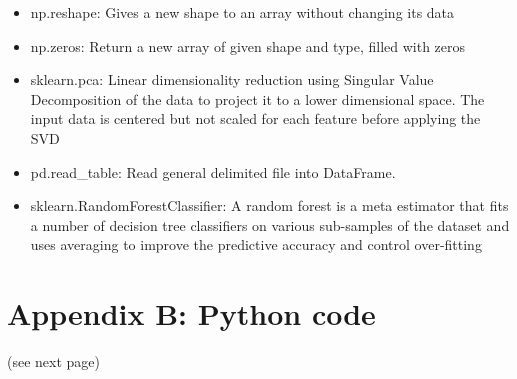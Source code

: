 \documentclass{cup-pan}
\begin{document}
\begin{itemize}
	\item np.reshape: Gives a new shape to an array without changing its data \\
	\item np.zeros: Return a new array of given shape and type, filled with zeros\\
	\item sklearn.pca: Linear dimensionality reduction using Singular Value Decomposition of the data to project it to a lower dimensional space. The input data is centered but not scaled for each feature before applying the SVD
	\item pd.read\_table: Read general delimited file into DataFrame.
	\item sklearn.RandomForestClassifier: A random forest is a meta estimator that fits a number of decision tree classifiers on various sub-samples of the dataset and uses averaging to improve the predictive accuracy and control over-fitting
\end{itemize}
\noindent

\section{Appendix B: Python code}
\noindent
(see next page)
\end{document}
